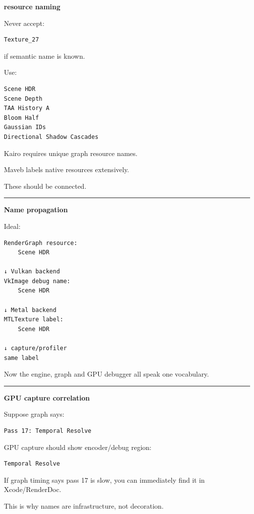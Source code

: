\textbf{resource naming}

Never accept:

\begin{verbatim}
Texture_27
\end{verbatim}

if semantic name is known.

Use:

\begin{verbatim}
Scene HDR
Scene Depth
TAA History A
Bloom Half
Gaussian IDs
Directional Shadow Cascades
\end{verbatim}

Kairo requires unique graph resource names.

Maveb labels native resources extensively.

These should be connected.

\begin{center}\rule{0.5\linewidth}{0.5pt}\end{center}

\textbf{Name propagation}

Ideal:

\begin{verbatim}
RenderGraph resource:
    Scene HDR

↓ Vulkan backend
VkImage debug name:
    Scene HDR

↓ Metal backend
MTLTexture label:
    Scene HDR

↓ capture/profiler
same label
\end{verbatim}

Now the engine, graph and GPU debugger all speak one vocabulary.

\begin{center}\rule{0.5\linewidth}{0.5pt}\end{center}

\textbf{GPU capture correlation}

Suppose graph says:

\begin{verbatim}
Pass 17: Temporal Resolve
\end{verbatim}

GPU capture should show encoder/debug region:

\begin{verbatim}
Temporal Resolve
\end{verbatim}

If graph timing says pass 17 is slow, you can immediately find it in Xcode/RenderDoc.

This is why names are infrastructure, not decoration.

